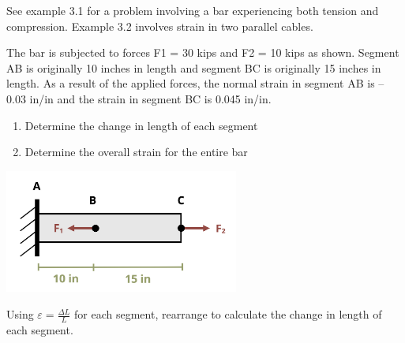 \documentclass[
  letterpaper,
  DIV=11,
  numbers=noendperiod]{scrreprt}
\providecommand{\tightlist}{%
  \setlength{\itemsep}{0pt}\setlength{\parskip}{0pt}}\usepackage{longtable,booktabs,array}
\theoremstyle{definition}
\theoremstyle{remark}
\begin{document}
See example 3.1 for a problem involving a bar experiencing both tension
and compression. Example 3.2 involves strain in two parallel cables.

\begin{tcolorbox}[enhanced jigsaw, leftrule=.75mm, colbacktitle=quarto-callout-tip-color!10!white, breakable, opacityback=0, colback=white, titlerule=0mm, toprule=.15mm, colframe=quarto-callout-tip-color-frame, coltitle=black, title={Example 3.1}, toptitle=1mm, bottomrule=.15mm, rightrule=.15mm, left=2mm, arc=.35mm, opacitybacktitle=0.6, bottomtitle=1mm]

The bar is subjected to forces F1 = 30 kips and F2 = 10 kips as shown.
Segment AB is originally 10 inches in length and segment BC is
originally 15 inches in length. As a result of the applied forces, the
normal strain in segment AB is -- 0.03 in/in and the strain in segment
BC is 0.045 in/in.

\begin{enumerate}
\def\labelenumi{\arabic{enumi}.}
\tightlist
\item
  Determine the change in length of each segment
\item
  Determine the overall strain for the entire bar
\end{enumerate}

\begin{center}
\includegraphics[width=3.03125in,height=\textheight]{images/CH3 PNGs/example 3.1.png}
\end{center}

\begin{tcolorbox}[enhanced jigsaw, leftrule=.75mm, colbacktitle=quarto-callout-tip-color!10!white, breakable, opacityback=0, colback=white, titlerule=0mm, toprule=.15mm, colframe=quarto-callout-tip-color-frame, coltitle=black, title={Solution}, toptitle=1mm, bottomrule=.15mm, rightrule=.15mm, left=2mm, arc=.35mm, opacitybacktitle=0.6, bottomtitle=1mm]

Using \(\varepsilon=\frac{\Delta L}{L}\) for each segment, rearrange to
calculate the change in length of each segment.


\end{tcolorbox}
\end{tcolorbox}
\end{document}
